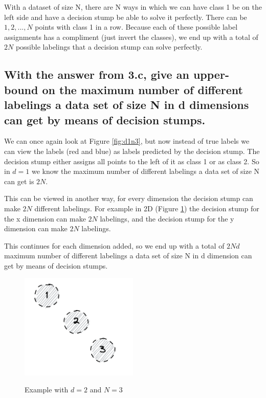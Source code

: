 \documentclass[11pt,a4paper]{article}
\begin{document}
With a dataset of size N, there are N ways in which we can have class 1 be on the left side and have a decision stump be able to solve it perfectly. There can be $1, 2, ..., N$ points with class 1 in a row.
Because each of these possible label assignments has a compliment (just invert the classes), we end up with a total of $2N$ possible labelings that a decision stump can solve perfectly.


\subsection{With the answer from 3.c, give an upper-bound on the maximum number of different
labelings a data set of size N in d dimensions can get by means of decision stumps.}
\label{sec:2d}

We can once again look at Figure \ref{fig:d1n3}, but now instead of true labels we can view the labels (red and blue) as labels predicted by the decision stump. The decision stump either assigns all points to the left of it as class 1 or as class 2. So in $d=1$ we know the maximum number of different labelings a data set of size N can get is $2N$. 

This can be viewed in another way, for every dimension the decision stump can make $2N$ different labelings. For example in 2D (Figure \ref{fig:d2n3}) the decision stump for the x dimension can make $2N$ labelings, and the decision stump for the y dimension can make $2N$ labelings.

This continues for each dimension added, so we end up with a total of $2Nd$ maximum number of different labelings a data set of size N in d dimension can get by means of decision stumps.


\begin{figure}[h]
    \caption{Example with $d=2$ and $N=3$}
    \centering
    \includegraphics[width=0.5\textwidth]{d2n3_unlabeled.png}
    \label{fig:d2n3}
\end{figure}
\end{document}
